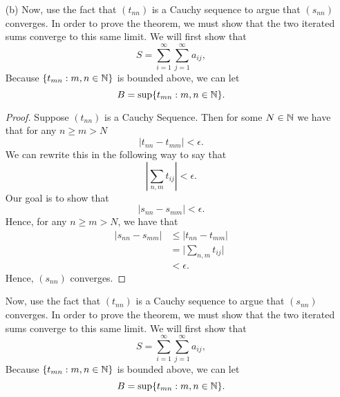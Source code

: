 \begin{enumerate}
        \begin{proof}
            Our goal is to show that \( (t_{nn}) \) is converges to \( L \). That is, our goal is to show that \( (t_{nn}) \) is bounded and monotone. We know that \( (t_{nn}) \) is monotone since all \( t_{nn} \) are non-negative terms and that \( \sum_{ n,m }^{ \infty  } | a_{ij} |  = L  \) where \( L \geq 0 \). To show that \( (t_{nn}) \) is bounded note that 
            \[ t_{mn} = \sum_{ i=1 }^{ m } \sum_{ j=1 }^{ n } | a_{ij} | \leq \sum_{ i=1 }^{ m } \sum_{ j=1 }^{ \infty  } | a_{ij} | \leq \sum_{ i=1 }^{ m } b_i \leq L. \]
            Hence, \( (t_{nn}) \) is a bounded sequence. By the Monotone Convergence Theorem, \( (t_{nn}) \) converges.
        \end{proof}
    \item[(b)] Now, use the fact that \( (t_{nn})\) is a Cauchy sequence to argue that \( (s_{nn})\) converges. In order to prove the theorem, we must show that the two iterated sums converge to this same limit. We will first show that 
        \[ S = \sum_{ i=1 }^{ \infty  } \sum_{ j=1 }^{ \infty  } a_{ij}, \] 
        Because \( \{ t_{mn} : m,n \in \mathbb{N}  \} \) is bounded above, we can let 
        \[ B = \sup \{ t_{mn}: m,n \in \mathbb{N}  \}.\] 
        \begin{proof}
        Suppose \( (t_{nn}) \) is a Cauchy Sequence. Then for some \( N \in \mathbb{N} \) we have that for any \( n \geq m > N  \)
        \[  | t_{nn} - t_{mm} | < \epsilon.  \]
        We can rewrite this in the following way to say that 
        \[  | \sum_{ n,m } t_{ij} | < \epsilon.    \]
        Our goal is to show that 
        \[  | s_{nn} - s_{mm} | < \epsilon.   \]
        Hence, for any \( n \geq  m > N  \), we have that 
        \begin{align*}
            | s_{nn} - s_{mm } | &\leq | t_{nn} - t_{m m }|  \\
                                 &= \Big| \sum_{ n,m } t_{ij} \Big|  \\
                                 &< \epsilon.
        \end{align*}
        Hence, \( (s_{nn}) \) converges.

        \end{proof}

    Now, use the fact that \( (t_{nn})\) is a Cauchy sequence to argue that \( (s_{nn})\) converges. In order to prove the theorem, we must show that the two iterated sums converge to this same limit. We will first show that 
        \[ S = \sum_{ i=1 }^{ \infty  } \sum_{ j=1 }^{ \infty  } a_{ij}, \] 
        Because \( \{ t_{mn} : m,n \in \mathbb{N}  \} \) is bounded above, we can let 
        \[ B = \sup \{ t_{mn}: m,n \in \mathbb{N}  \}.\] 
    \end{enumerate}


